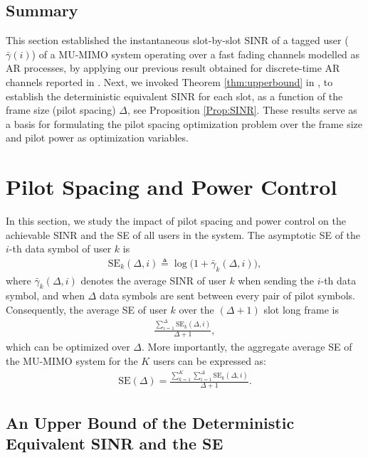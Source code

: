 \documentclass[conference, a4paper, 10pt]{IEEEtran}
\begin{document}
\subsection{Summary}
This section established the instantaneous slot-by-slot \ac{SINR} of a tagged user ($\bar \gamma(i)$) of a \ac{MU-MIMO} system operating over %
a fast fading channels modelled as \ac{AR} processes,
by applying our previous result obtained for discrete-time \ac{AR} channels
reported in \cite{Fodor:21}.
Next, we invoked Theorem \ref{thm:upperbound} in \cite{Wagner:2012}, to establish the deterministic
equivalent \ac{SINR} for each slot, as a function of the frame size (pilot spacing) $\Delta$, see Proposition \ref{Prop:SINR}.
These results serve as a basis for formulating the pilot spacing optimization problem over the frame size and pilot power as optimization variables.

\section{Pilot Spacing and Power Control}
\label{Sec:PilotSpacing}
In this section, we study the impact of pilot spacing and power control on the achievable \ac{SINR}
and the \ac{SE} of all users in the system.
The asymptotic \ac{SE} of the $i$-th data symbol of user $k$ is
\begin{align}
\label{eq:SE}
\text{SE}_k(\Delta, i) \triangleq \log\Big(1 + \bar{\gamma}_k(\Delta, i)\Big),
\end{align}
where $\bar{\gamma}_k(\Delta, i)$ denotes the average \ac{SINR} of  user $k$ when sending the $i$-th data symbol, and when $\Delta$ data symbols are sent between every pair of pilot symbols.
Consequently, the %
average \ac{SE}
of  user $k$ over the $(\Delta+1)$ slot long frame is
\begin{align}
\frac{\sum_{i=1}^{\Delta}\text{SE}_k(\Delta, i)}{\Delta + 1},
\end{align}
which can be optimized over $\Delta$.
More importantly, %
the aggregate average \ac{SE}
of the \ac{MU-MIMO} system for the $K$ users can be expressed as:
\begin{align}
\text{SE}(\Delta) = \frac{\sum_{k=1}^K \sum_{i=1}^{\Delta}\text{SE}_k(\Delta,i)}{\Delta + 1}.
\label{eq:multiopt}
\end{align}


\subsection{An Upper Bound of the Deterministic Equivalent \ac{SINR} and the \ac{SE}}
\end{document}
